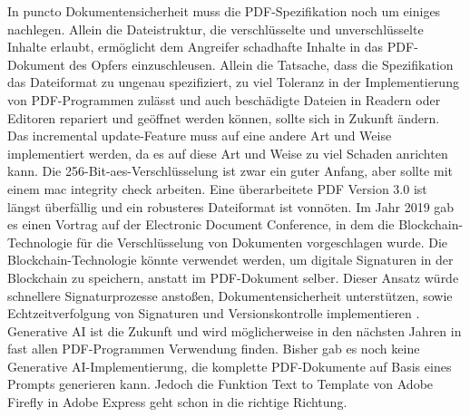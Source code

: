 In puncto Dokumentensicherheit muss die PDF-Spezifikation noch um einiges nachlegen. Allein die Dateistruktur, die verschlüsselte und unverschlüsselte Inhalte erlaubt, ermöglicht dem Angreifer schadhafte Inhalte in das PDF-Dokument des Opfers einzuschleusen. Allein die Tatsache, dass die Spezifikation das Dateiformat zu ungenau spezifiziert, zu viel Toleranz in der Implementierung von PDF-Programmen zulässt und auch beschädigte Dateien in Readern oder Editoren repariert und geöffnet werden können, sollte sich in Zukunft ändern. Das incremental update-Feature muss auf eine andere Art und Weise implementiert werden, da es auf diese Art und Weise zu viel Schaden anrichten kann. Die 256-Bit-\gls{aes}-Verschlüsselung ist zwar ein guter Anfang, aber sollte mit einem \gls{mac} integrity check arbeiten. Eine überarbeitete PDF Version 3.0 ist längst überfällig und ein robusteres Dateiformat ist vonnöten. Im Jahr 2019 gab es einen Vortrag auf der Electronic Document Conference, in dem die Blockchain-Technologie für die Verschlüsselung von Dokumenten vorgeschlagen wurde. Die Blockchain-Technologie könnte verwendet werden, um digitale Signaturen in der Blockchain zu speichern, anstatt im PDF-Dokument selber. Dieser Ansatz würde schnellere Signaturprozesse anstoßen, Dokumentensicherheit unterstützen, sowie Echtzeitverfolgung von Signaturen und Versionskontrolle implementieren \cite{pdf-association-blockchain}. Generative AI ist die Zukunft und wird möglicherweise in den nächsten Jahren in fast allen PDF-Programmen Verwendung finden. Bisher gab es noch keine Generative AI-Implementierung, die komplette PDF-Dokumente auf Basis eines Prompts generieren kann. Jedoch die Funktion Text to Template von Adobe Firefly in Adobe Express geht schon in die richtige Richtung. 